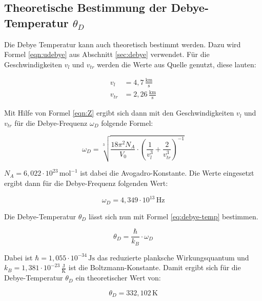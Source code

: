 \subsection[Theoretische Bestimmung der Debye-Temperatur]{Theoretische Bestimmung der Debye-Temperatur $\theta_D$}
\label{sec:theo_debye_temp}

Die Debye Temperatur kann auch theoretisch bestimmt werden. Dazu wird Formel \eqref{eqn:udebye} aus Abschnitt \ref{sec:debye} verwendet. Für die Geschwindigkeiten $v_l$ und $v_{tr}$ werden die Werte aus Quelle \cite{Anleitung} genutzt, diese lauten:

\begin{align*}
    v_l &=  4, \! 7 \, \frac{\mathrm{km}}{\mathrm{s}} \\
    v_{tr} &= 2, \! 26 \, \frac{\mathrm{km}}{\mathrm{s}}
\end{align*}

Mit Hilfe von Formel \eqref{eqn:Z} ergibt sich dann mit den Geschwindigkeiten $v_l$ und $v_{tr}$ für die Debye-Frequenz $\omega_D$ folgende Formel:

\begin{equation}
    \omega_D = \sqrt[3]{\frac{18 \pi^2 N_A}{V_0} \cdot \left( \frac{1}{v_l^3} + \frac{2}{v_{tr}^3} \right)^{-1} }
    \label{eq:omega}
\end{equation}

$N_A = 6, \! 022 \cdot 10^ {23} \, \mathrm{mol}^{-1}$ ist dabei die Avogadro-Konstante. Die Werte eingesetzt ergibt dann für die Debye-Frequenz folgenden Wert:

\begin{equation*}
    \omega_D = 4, \! 349 \cdot 10^{13} \, \mathrm{Hz}
\end{equation*}

Die Debye-Temperatur $\theta_D$ lässt sich nun mit Formel \eqref{eq:debye-temp} bestimmen.

\begin{equation}
    \theta_D = \frac{\hbar}{k_B} \cdot \omega_D
    \label{eq:debye-temp}
\end{equation}

Dabei ist $\hbar = 1, \! 055 \cdot 10^{-34} \, \mathrm{Js}$ \cite{h_quer} das reduzierte planksche Wirkungsquantum und $k_B = 1, \! 381 \cdot 10^{-23} \, \frac{\mathrm{J}}{\mathrm{K}}$ \cite{k_B} ist die Boltzmann-Konstante. Damit ergibt sich für die Debye-Temperatur $\theta_D$ ein theoretischer Wert von:

\begin{equation*}
    \theta_D = 332, \! 102 \, \mathrm{K}
\end{equation*}